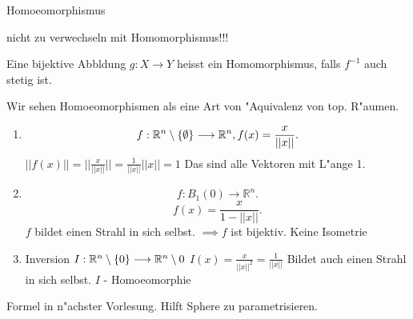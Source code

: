 \documentclass[class=article, crop=false]{standalone}
\begin{document}
\begin{zettel}{Homoeomorphismus}
\begin{flashcard}
    nicht zu verwechseln mit Homomorphismus!!!
\begin{definition}[Homoeomorphismus]
   Eine bijektive Abbldung $g:X \longrightarrow Y$  heisst ein Homomorphismus, falls $f^{-1} $  auch stetig ist.
   \begin{remark}
      Wir sehen Homoeomorphismen als eine Art von "Aquivalenz von top. R"aumen. 
   \end{remark}
\end{definition}

\begin{example}
    \begin{enumerate}
    \item \[
        f: \mathbb{R}^n \setminus \set{\emptyset} \longrightarrow  \mathbb{R}^n , f(x) =  \frac{x}{ ||x||}
    .\]
    $ ||f(x)|| = ||\frac{x}{||x||}|| = \frac{1}{ ||x||} ||x|| = 1 $ 
    Das sind alle Vektoren mit L"ange 1.
     \item \[
         f: B_1 (0) \longrightarrow \mathbb{R}^n
     .\]
     \[
         f(x) =  \frac{x}{1 - ||x||} 
     .\]
     $f$ bildet einen Strahl in sich selbst. $\implies f$ ist bijektiv. Keine Isometrie

     \item Inversion $I: \mathbb{R}^n \setminus \set{0} \longrightarrow  \R^n \setminus 0$  \quad $I(x) = \frac{x}{ ||x||^2 } = \frac{1}{ ||x||}  $ Bildet auch einen Strahl in sich selbst. $I$ - Homoeomorphie
    \end{enumerate}
\end{example}

\begin{example}
    Formel in n"achster Vorlesung. Hilft Sphere zu parametrisieren.
\end{example}

\end{flashcard}
\end{zettel}
\end{document}
